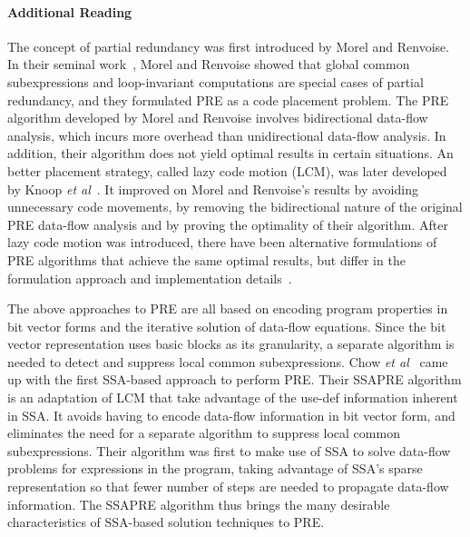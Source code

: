 \paragraph{Additional Reading}
\label{sec:ssapre:related}
The concept of partial redundancy was first introduced by Morel and Renvoise. 
In their seminal work~\cite{MR79}, Morel and Renvoise showed that global common subexpressions and loop-invariant computations are special cases of partial redundancy, and they formulated PRE as a code placement problem. 
The PRE algorithm developed by Morel and Renvoise involves bidirectional data-flow analysis, which incurs more overhead than unidirectional data-flow analysis. 
In addition, their algorithm does not yield optimal results in certain situations. 
An better placement strategy, called lazy code motion (LCM), was later developed by Knoop {\it et al}~\cite{Knoop92,Knoop94}. 
It improved on Morel and Renvoise's results by avoiding unnecessary code movements, by removing the bidirectional nature of the original PRE data-flow analysis and by proving the optimality of their algorithm. 
After lazy code motion was introduced, there have been alternative formulations of PRE algorithms that achieve the same optimal results, but differ in the formulation approach and implementation details~\cite{DS93,Dhamdhere02,Paleri03,XueKnoop06}.

The above approaches to PRE are all based on encoding program properties in bit vector forms and the iterative solution of data-flow equations. 
Since the bit vector representation uses basic blocks as its granularity, a separate algorithm is needed to detect and suppress local common subexpressions. 
Chow {\it et al}~\cite{Chow97,Kennedy99} came up with the first SSA-based approach to perform PRE. 
Their SSAPRE algorithm is an adaptation of LCM that take advantage of the use-def information inherent in SSA. 
It avoids having to encode data-flow information in bit vector form, and eliminates the need for a separate algorithm to suppress local common subexpressions. 
Their algorithm was first to make use of SSA to solve data-flow problems for expressions in the program, taking advantage of SSA's sparse representation so that fewer number of steps are needed to propagate data-flow information. 
The SSAPRE algorithm thus brings the many desirable characteristics of SSA-based solution techniques to PRE.

